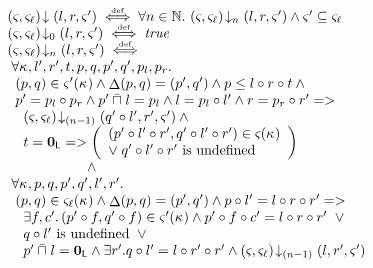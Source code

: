 \begin{definition}
\[
\begin{array}{l}
	\extendsAM{\amod{}, \amod{\ell}}{l}{r}{\amod{}'} \iffdef \for{n \in \Nats} \extendsAMUpto{\amod{}, \amod{\ell}}{n}{l}{r}{\amod{}'}  \land \amod{}' \subseteq \amod{\ell}\\
	\extendsAMUpto{\amod{}, \amod{\ell}}{0}{l}{r}{\amod{}'} \iffdef \m{true} \\ 
	\extendsAMUpto{\amod{}, \amod{\ell}}{n}{l}{r}{\amod{}'} \iffdef \\ 
	\hspace*{0.1cm}\for{\ca{}, l', r', t, p, q, p', q', p_l, p_r}\\
	\hspace*{0.2cm}(p, q) \in \amod{}'(\ca{}) 
	\land \updateFP{p, q} = (p', q')
	\land p \leq  l \composeL r \composeL t \land\null\\
	\hspace*{0.2cm}p' = p_l \composeL p_r 
	\land p' \maxMeetL l = p_l 
	\land l = p_l \composeL l' 
	\land r = p_r \composeL r' =>\\
	\hspace*{0.4cm} \extendsAMUpto{\amod{}, \amod{\ell}}{(n-1)}{q' \composeL l'}{r'}{\amod{}'} \land\null\\
	\hspace*{0.4cm}t = \unitL => 
	\left(
	\begin{array}{l}
		(p' \composeL l' \composeL r', q' \composeL l' \composeL r') \in \amod{}(\ca{})\\
		\lor\; q' \composeL l' \composeL r' \text{ is undefined} 
	\end{array}
	\right)\\
		\hspace*{2cm} \land\\
  \hspace*{0.1cm}\for{\ca{}, p, q, p', q', l', r'} \\
  \hspace*{0.2cm} (p, q) \in \amod{\ell}(\ca{})
  \land \updateFP{p, q} = (p', q')
  \land p \composeL l' = l \composeL r \composeL r' =>\\
  \hspace*{0.4cm}\exsts{f, c'} (p' \composeL f, q' \composeL f) \in \amod{}'(\ca{}) \land p' \composeL f \composeL c' =  l \composeL r \composeL r' \;\;\lor\\
		\hspace*{0.4cm}q \composeL l' \text{ is undefined} \;\;\lor\\
		\hspace*{0.4cm}p' \maxMeetL l = \unitL \land \exsts{r'}\! q \composeL l' = l \composeL r' \composeL r' \land \extendsAMUpto{\amod{}, \amod{\ell}}{(n-1)}{l}{r'}{\amod{}'}
\end{array}
\]
\end{definition}


